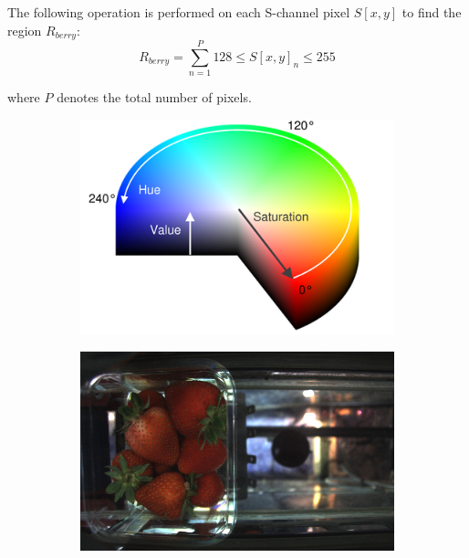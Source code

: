 \documentclass[fleqn,twoside]{article}
\begin{document}
The following operation is performed on each S-channel pixel $S[x,y]$ to find the region $R_{berry}$:
\begin{equation}
R_{berry} = \sum_{n=1}^{P} 128 \leq S[x,y]_n \leq 255
\end{equation}

where $P$ denotes the total number of pixels. 


\begin{figure}[ht]
	\centering
	\begin{subfigure}{.4\textwidth}
		\centering
		\includegraphics[width=.9\linewidth]{hue_sat.png}
		\caption{}
		\label{fig:hue_sat}
	\end{subfigure}%
	\begin{subfigure}{.4\textwidth}
		\centering
		\includegraphics[width=.9\linewidth]{bg_example.png}
		\caption{}
		\label{fig:bg_example}
	\end{subfigure}%


\end{figure}
\end{document}
